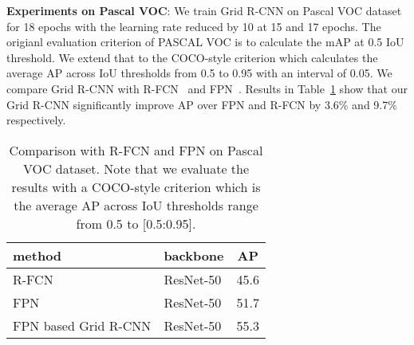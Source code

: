 \documentclass[10pt,twocolumn,letterpaper]{article}
\begin{document}
\textbf{Experiments on Pascal VOC}: We train Grid R-CNN on Pascal VOC dataset for 18 epochs with the learning rate reduced by 10 at 15 and 17 epochs. The origianl evaluation criterion of PASCAL VOC is to calculate the mAP at 0.5 IoU threshold. We extend that to the COCO-style criterion which calculates the average AP across IoU thresholds from 0.5 to 0.95 with an interval of 0.05. We compare Grid R-CNN with R-FCN~\cite{dai2016r} and FPN~\cite{lin2017feature}. Results in Table~\ref{tab:voc} show that our Grid R-CNN significantly improve AP over FPN and R-FCN by 3.6\% and 9.7\% respectively.
\begin{table}[t]
\begin{center}
\begin{tabular}{ l | l | c  }
\hline
method & backbone & AP \\
\hline
R-FCN & ResNet-50  & 45.6  \\
FPN & ResNet-50  & 51.7  \\
FPN based Grid R-CNN & ResNet-50  & 55.3 \\
\hline
\end{tabular}
\vspace{1mm}
\caption{Comparison with R-FCN and FPN on Pascal VOC dataset. Note that we evaluate the results with a COCO-style criterion which is the average AP across IoU thresholds range from 0.5 to [0.5:0.95].}
\label{tab:voc}
\vspace{-5mm}
\end{center}
\end{table}
\end{document}
